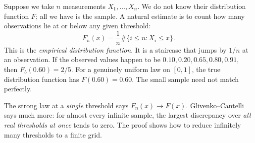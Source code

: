 Suppose we take $n$ measurements $X_1,\ldots,X_n$. We do not know their distribution function $F$; all we have is the sample. A natural estimate is to count how many observations lie at or below any given threshold:
\[
 F_n(x)=\frac1n\#\{i\le n:X_i\le x\}.
\]
This is the \emph{empirical distribution function}. It is a staircase that jumps by $1/n$ at an observation. If the observed values happen to be $0.10,0.20,0.65,0.80,0.91$, then $F_5(0.60)=2/5$. For a genuinely uniform law on $[0,1]$, the true distribution function has $F(0.60)=0.60$. The small sample need not match perfectly.

The strong law at a \emph{single} threshold says $F_n(x)\to F(x)$. Glivenko--Cantelli says much more: for almost every infinite sample, the largest discrepancy over \emph{all real thresholds at once} tends to zero. The proof shows how to reduce infinitely many thresholds to a finite grid.

